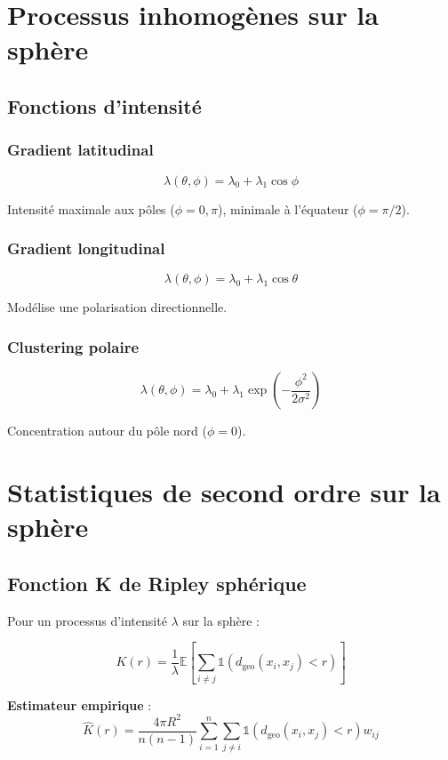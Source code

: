 \section{Processus inhomogènes sur la sphère}

\subsection{Fonctions d'intensité}

\subsubsection{Gradient latitudinal}

\[
\lambda(\theta, \phi) = \lambda_0 + \lambda_1 \cos\phi
\]

Intensité maximale aux pôles ($\phi = 0, \pi$), minimale à l'équateur ($\phi = \pi/2$).

\subsubsection{Gradient longitudinal}

\[
\lambda(\theta, \phi) = \lambda_0 + \lambda_1 \cos\theta
\]

Modélise une polarisation directionnelle.

\subsubsection{Clustering polaire}

\[
\lambda(\theta, \phi) = \lambda_0 + \lambda_1 \exp\left(-\frac{\phi^2}{2\sigma^2}\right)
\]

Concentration autour du pôle nord ($\phi = 0$).

\section{Statistiques de second ordre sur la sphère}

\subsection{Fonction K de Ripley sphérique}

Pour un processus d'intensité $\lambda$ sur la sphère :

\[
K(r) = \frac{1}{\lambda} \mathbb{E}\left[\sum_{i \neq j} \mathbb{1}(d_{\text{geo}}(x_i, x_j) < r)\right]
\]

\textbf{Estimateur empirique} :
\[
\hat{K}(r) = \frac{4\pi R^2}{n(n-1)} \sum_{i=1}^n \sum_{j \neq i} \mathbb{1}(d_{\text{geo}}(x_i, x_j) < r) w_{ij}
\]

